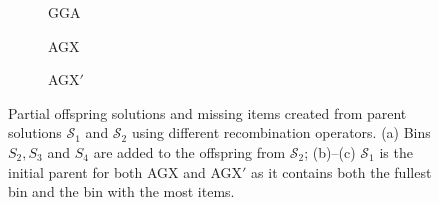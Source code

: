\documentclass[authoryear]{elsarticle}
\begin{document}
\begin{figure}[H]	
	\centering
	\begin{minipage}{0.3\textwidth}
		
	\end{minipage} \hspace{15mm}
	\begin{minipage}{0.3\textwidth}
		
	\end{minipage}
\end{figure}

\begin{figure}[H]	
	\centering
	\begin{subfigure}[h]{0.3\textwidth}
		
		\caption{GGA}
		\label{fig:gga}
	\end{subfigure} \hspace{5mm}
	\begin{subfigure}[h]{0.3\textwidth}
		
		\caption{AGX}
		\label{fig:agx}
	\end{subfigure} \hspace{5mm}
	\begin{subfigure}[h]{0.3\textwidth}
		
		\caption{AGX$'$}
		\label{fig:agxdash}
	\end{subfigure}
	\caption{Partial offspring solutions and missing items created from parent solutions $\mathcal{S}_1$ and $\mathcal{S}_2$ using different recombination operators. (a) Bins $S_2, S_3$ and $S_4$ are added to the offspring from $\mathcal{S}_2$; (b)--(c) $\mathcal{S}_1$ is the initial parent for both AGX and AGX$'$ as it contains both the fullest bin and the bin with the most items.}
	\label{fig:recomb}
\end{figure}
\end{document}
